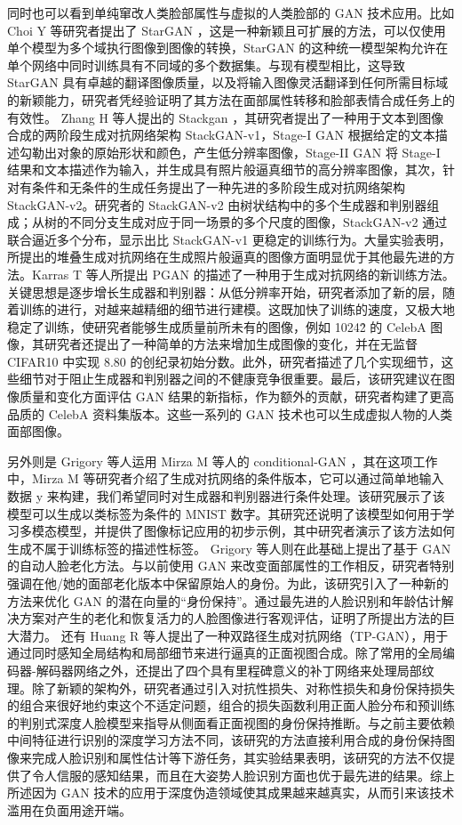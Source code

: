 同时也可以看到单纯窜改人类脸部属性与虚拟的人类脸部的 GAN 技术应用。比如 Choi Y 等研究者提出了 StarGAN \cite{choi2018stargan}，这是一种新颖且可扩展的方法，可以仅使用单个模型为多个域执行图像到图像的转换，StarGAN 的这种统一模型架构允许在单个网络中同时训练具有不同域的多个数据集。与现有模型相比，这导致 StarGAN 具有卓越的翻译图像质量，以及将输入图像灵活翻译到任何所需目标域的新颖能力，研究者凭经验证明了其方法在面部属性转移和脸部表情合成任务上的有效性。 Zhang H 等人提出的 Stackgan \cite{zhang2018stackgan++} ，其研究者提出了一种用于文本到图像合成的两阶段生成对抗网络架构 StackGAN-v1，Stage-I GAN 根据给定的文本描述勾勒出对象的原始形状和颜色，产生低分辨率图像，Stage-II GAN 将 Stage-I 结果和文本描述作为输入，并生成具有照片般逼真细节的高分辨率图像，其次，针对有条件和无条件的生成任务提出了一种先进的多阶段生成对抗网络架构 StackGAN-v2。研究者的 StackGAN-v2 由树状结构中的多个生成器和判别器组成；从树的不同分支生成对应于同一场景的多个尺度的图像，StackGAN-v2 通过联合逼近多个分布，显示出比 StackGAN-v1 更稳定的训练行为。大量实验表明，所提出的堆叠生成对抗网络在生成照片般逼真的图像方面明显优于其他最先进的方法。Karras T 等人所提出 PGAN \cite{karras2017progressive} 的描述了一种用于生成对抗网络的新训练方法。关键思想是逐步增长生成器和判别器：从低分辨率开始，研究者添加了新的层，随着训练的进行，对越来越精细的细节进行建模。这既加快了训练的速度，又极大地稳定了训练，使研究者能够生成质量前所未有的图像，例如 1024\^2 的 CelebA 图像，其研究者还提出了一种简单的方法来增加生成图像的变化，并在无监督 CIFAR10 中实现 8.80 的创纪录初始分数。此外，研究者描述了几个实现细节，这些细节对于阻止生成器和判别器之间的不健康竞争很重要。最后，该研究建议在图像质量和变化方面评估 GAN 结果的新指标，作为额外的贡献，研究者构建了更高品质的 CelebA 资料集版本。这些一系列的 GAN 技术也可以生成虚拟人物的人类面部图像。

另外则是 Grigory 等人\cite{antipov2017face}运用 Mirza M 等人的 conditional-GAN \cite{mirza2014conditional} ，其在这项工作中，Mirza M 等研究者介绍了生成对抗网络的条件版本，它可以通过简单地输入数据 y 来构建，我们希望同时对生成器和判别器进行条件处理。该研究展示了该模型可以生成以类标签为条件的 MNIST 数字。其研究还说明了该模型如何用于学习多模态模型，并提供了图像标记应用的初步示例，其中研究者演示了该方法如何生成不属于训练标签的描述性标签。 Grigory 等人则在此基础上提出了基于 GAN 的自动人脸老化方法。与以前使用 GAN 来改变面部属性的工作相反，研究者特别强调在他/她的面部老化版本中保留原始人的身份。为此，该研究引入了一种新的方法来优化 GAN 的潜在向量的“身份保持”。通过最先进的人脸识别和年龄估计解决方案对产生的老化和恢复活力的人脸图像进行客观评估，证明了所提出方法的巨大潜力。
还有 Huang R 等人\cite{huang2017beyond}提出了一种双路径生成对抗网络（TP-GAN），用于通过同时感知全局结构和局部细节来进行逼真的正面视图合成。除了常用的全局编码器-解码器网络之外，还提出了四个具有里程碑意义的补丁网络来处理局部纹理。除了新颖的架构外，研究者通过引入对抗性损失、对称性损失和身份保持损失的组合来很好地约束这个不适定问题，组合的损失函数利用正面人脸分布和预训练的判别式深度人脸模型来指导从侧面看正面视图的身份保持推断。与之前主要依赖中间特征进行识别的深度学习方法不同，该研究的方法直接利用合成的身份保持图像来完成人脸识别和属性估计等下游任务，其实验结果表明，该研究的方法不仅提供了令人信服的感知结果，而且在大姿势人脸识别方面也优于最先进的结果。综上所述因为 GAN 技术的应用于深度伪造领域使其成果越来越真实，从而引来该技术滥用在负面用途开端。

